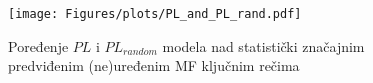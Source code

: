 \begin{figure}[th]
\hspace*{-3.0cm} 
\texttt{[image: Figures/plots/PL\_and\_PL\_rand.pdf]}
\caption {
  Poređenje $PL$ i $PL_{random}$ modela nad statistički značajnim predviđenim (ne)uređenim MF ključnim rečima
}
\label{fig:PLrand}
\end{figure}

%
%
%
%
%


